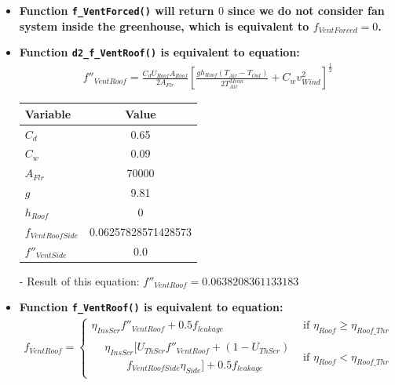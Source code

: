 \documentclass[a4paper]{article}
\numberwithin{equation}{section}
\begin{document}
\begin{itemize}
  \item \textbf{Function \texttt{f\_VentForced()} will return \( 0 \) since we do not consider fan system inside the greenhouse, which is equivalent to \( f_{VentForced} = 0 \).} \label{fVentForced}

  \item \textbf{Function \texttt{d2\_f\_VentRoof()} is equivalent to equation:}
        \begin{align*}
          f''_{VentRoof} = \frac{C_d U_{Roof} A_{Roof}}{2A_{Flr}} {\left[\frac{gh_{Roof}(T_{Air} - T_{Out})}{2T^{Mean}_{Air}} + C_w v^2_{Wind}\right]}^{ \frac{1}{2}}
        \end{align*}

        \begin{table}[H]
          \centering
          \begin{tabular}{@{}lS[table-format=5.17]@{}}
            \toprule
            \textbf{Variable}    & \textbf{Value}      \\
            \midrule
            \( C_d \)              & 0.65                \\
            \( C_w \)              & 0.09                \\
            \( A_{Flr} \)          & 70000               \\
            \( g \)                & 9.81                \\
            \( h_{Roof} \)         & 0                   \\
            \( f_{VentRoofSide} \) & 0.06257828571428573 \\
            \( f''_{VentSide} \)   & 0.0                 \\
            \bottomrule
          \end{tabular}
        \end{table}

  \item[-] Result of this equation: \( f''_{VentRoof} = 0.0638208361133183 \)

  \item \textbf{Function \texttt{f\_VentRoof()} is equivalent to equation:}\label{fVentRoof}
        \begin{gather*}
          f_{VentRoof} =
          \begin{cases}
            \eta_{InsScr} f''_{VentRoof} + 0.5f_{leakage} & \text{if~} \eta_{Roof} \geq \eta_{Roof\_Thr} \\
            \begin{split}
              & \eta_{InsScr} [U_{ThScr}f''_{VentRoof} + (1-U_{ThScr}) \\
              & \qquad f_{VentRoofSide} \eta_{Side}] + 0.5 f_{leakage}
            \end{split}                   & \text{if~}  \eta_{Roof} < \eta_{Roof\_Thr}
          \end{cases}
        \end{gather*}


\end{itemize}
\end{document}
